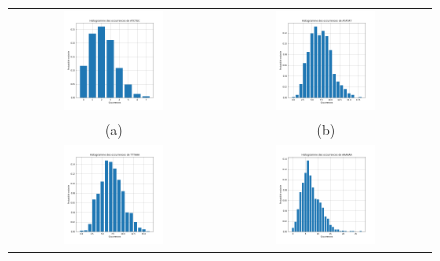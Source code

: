 \documentclass[a4paper,12pt]{article}
\begin{document}
\begin{figure}
\centering
\begin{tabular}{@{} c @{} c @{}}
\includegraphics[width=0.5\textwidth]{Figures/histogramme_ATCTGC.png} & \includegraphics[width=0.5\textwidth]{Figures/histogramme_ATATAT.png} \tabularnewline
(a) & (b) \tabularnewline
\includegraphics[width=0.5\textwidth]{Figures/histogramme_TTTAAA.png} & \includegraphics[width=0.5\textwidth]{Figures/histogramme_AAAAAA.png} \tabularnewline

\end{tabular}
\end{figure}
\end{document}
